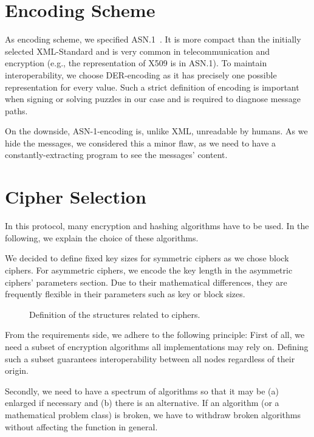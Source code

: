 \section{Encoding Scheme}
As encoding scheme, we specified ASN.1~\cite{dis19878824}. It is more compact than the initially selected XML-Standard and is very common in telecommunication and encryption (e.g., the representation of X509 is in ASN.1). To maintain interoperability, we choose DER-encoding as it has precisely one possible representation for every value. Such a strict definition of encoding is important when signing or solving puzzles in our case and is required to diagnose message paths.

On the downside, ASN-1-encoding is, unlike XML, unreadable by humans. As we hide the messages, we considered this a minor flaw, as we need to have a constantly-extracting program to see the messages' content.

\section{Cipher Selection}
In this protocol, many encryption and hashing algorithms have to be used. In the following, we explain the choice of these algorithms. 

We decided to define fixed key sizes for symmetric ciphers as we chose block ciphers. For asymmetric ciphers, we encode the key length in the asymmetric ciphers' parameters section. Due to their mathematical differences, they are frequently flexible in their parameters such as key or block sizes. 

\begin{figure}[ht]
	
	\caption{Definition of the structures related to ciphers.}
	\label{fig:defCiphers}
\end{figure}

From the requirements side, we adhere to the following principle:
First of all, we need a subset of encryption algorithms all implementations may rely on. Defining such a subset guarantees interoperability between all nodes regardless of their origin. 

Secondly, we need to have a spectrum of algorithms so that it may be (a) enlarged if necessary and (b) there is an alternative. If an algorithm (or a mathematical problem class) is broken, we have to withdraw broken algorithms without affecting the function in general. 


